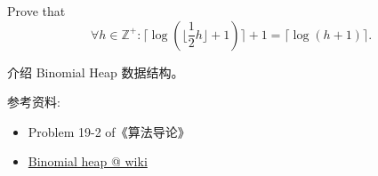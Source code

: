 \documentclass[a4paper, justified]{tufte-handout}
\begin{document}
\begin{solution}
\end{solution}

\begin{problem}[TC 6.4-4]
\end{problem}

\begin{solution}
\end{solution}

\begin{problem}
\end{problem}

\begin{solution}
\end{solution}

\begin{problem}[TC 6.5-5]
\end{problem}

\begin{solution}
\end{solution}

\begin{problem}[TC 6.5-9]
\end{problem}

\begin{solution}
\end{solution}

\beginoptional

\begin{problem}
  Prove that
  \[
    \forall h \in \mathbb{Z}^{+}: \lceil \log(\lfloor \frac{1}{2}h \rfloor + 1) \rceil + 1 = \lceil \log (h + 1) \rceil.
  \]
\end{problem}

\begin{solution}
\end{solution}

\beginot

\begin{ot}
  介绍 Binomial Heap 数据结构。

  \noindent 参考资料:
  \begin{itemize}
    \item Problem 19-2 of《算法导论》
    \item \href{https://en.wikipedia.org/wiki/Binomial\_heap}{Binomial heap @ wiki}
  \end{itemize}
\end{ot}
\end{document}
